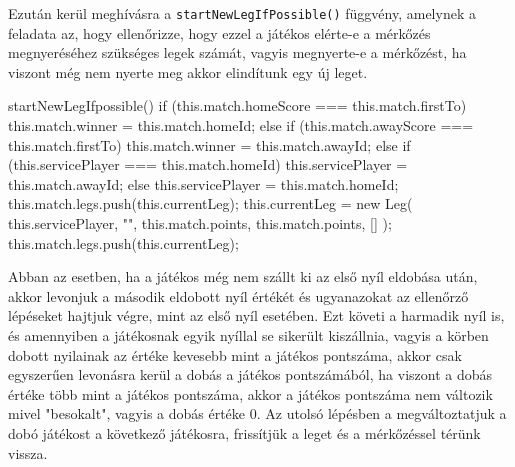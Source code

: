 Ezután kerül meghívásra a \texttt{startNewLegIfPossible()} függvény, amelynek a feladata az, hogy ellenőrizze, hogy ezzel a játékos elérte-e a mérkőzés megnyeréséhez szükséges legek számát, vagyis megnyerte-e a mérkőzést, ha viszont még nem nyerte meg akkor elindítunk egy új leget.

\begin{cpp}
startNewLegIfpossible() {
 if (this.match.homeScore === this.match.firstTo) {
  this.match.winner = this.match.homeId;
 } else if (this.match.awayScore === this.match.firstTo) {
    this.match.winner = this.match.awayId;
 } else {
   if (this.servicePlayer === this.match.homeId) {
    this.servicePlayer = this.match.awayId;
   } else {
     this.servicePlayer = this.match.homeId;
   }
   this.match.legs.push(this.currentLeg);
   this.currentLeg = new Leg(
     this.servicePlayer,
     "",
     this.match.points,
     this.match.points,
     []
    );
    this.match.legs.push(this.currentLeg);
  }
}
\end{cpp}

Abban az esetben, ha a játékos még nem szállt ki az első nyíl eldobása után, akkor levonjuk a második eldobott nyíl értékét és ugyanazokat az ellenőrző lépéseket hajtjuk végre, mint az első nyíl esetében. Ezt követi a harmadik nyíl is, és amennyiben a játékosnak egyik nyíllal se sikerült kiszállnia, vagyis a körben dobott nyilainak az értéke kevesebb mint a játékos pontszáma, akkor csak egyszerűen levonásra kerül a dobás a játékos pontszámából, ha viszont a dobás értéke több mint a játékos pontszáma, akkor a játékos pontszáma nem változik mivel "besokalt", vagyis a dobás értéke 0. Az utolsó lépésben a megváltoztatjuk a dobó játékost a következő játékosra, frissítjük a leget és a mérkőzéssel térünk vissza.

